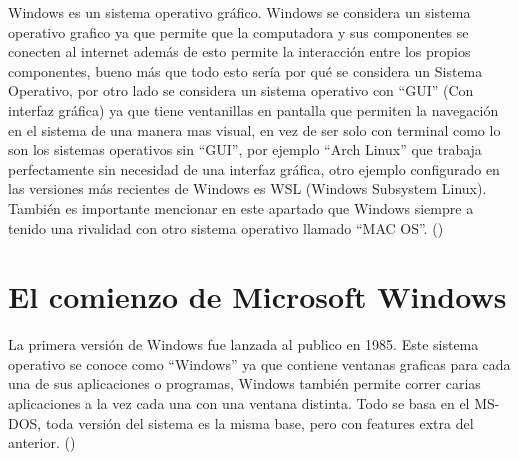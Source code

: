 \documentclass[stu, 12pt, letterpaper, donotrepeattitle, floatsintext, natbib, helv]{apa7}
\begin{document}
Windows es un sistema operativo gráfico. Windows se considera un sistema operativo grafico ya que permite que la computadora y sus componentes se conecten al internet además de esto permite la interacción entre los propios componentes, bueno más que todo esto sería por qué se considera un Sistema Operativo, por otro lado se considera un sistema operativo con “GUI” (Con interfaz gráfica) ya que tiene ventanillas en pantalla que permiten la navegación en el sistema de una manera mas visual, en vez de ser solo con terminal como lo son los sistemas operativos sin “GUI”, por ejemplo “Arch Linux” que trabaja perfectamente sin necesidad de una interfaz gráfica, otro ejemplo configurado en las versiones más recientes de Windows es WSL (Windows Subsystem Linux). También es importante mencionar en este apartado que Windows siempre a tenido una rivalidad con otro sistema operativo llamado “MAC OS”. (\cite{WhatIsWindows})

\section*{El comienzo de Microsoft Windows}
{}

La primera versión de Windows fue lanzada al publico en 1985. Este sistema operativo se conoce como “Windows” ya que contiene ventanas graficas para cada una de sus aplicaciones o programas, Windows también permite correr carias aplicaciones a la vez cada una con una ventana distinta. Todo se basa en el MS-DOS, toda versión del sistema es la misma base, pero con features extra del anterior. (\cite{WhatIsWindows})
\end{document}
